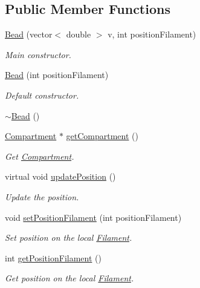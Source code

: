 \subsection*{Public Member Functions}
\begin{DoxyCompactItemize}
\item 
\hyperlink{classBead_aa91581c9111d101b95bec920798e22ac}{Bead} (vector$<$ double $>$ v, int position\+Filament)
\begin{DoxyCompactList}\small\item\em Main constructor. \end{DoxyCompactList}\item 
\hyperlink{classBead_a5bb15ab11fee13f78721759cadb5a5b4}{Bead} (int position\+Filament)
\begin{DoxyCompactList}\small\item\em Default constructor. \end{DoxyCompactList}\item 
\hyperlink{classBead_a21f0ccd7041f56c4038171d0da3a58ed}{$\sim$\+Bead} ()
\item 
\hyperlink{classCompartment}{Compartment} $\ast$ \hyperlink{classBead_ae6cfcc2936a2e12a3887c9fd824c6343}{get\+Compartment} ()
\begin{DoxyCompactList}\small\item\em Get \hyperlink{classCompartment}{Compartment}. \end{DoxyCompactList}\item 
virtual void \hyperlink{classBead_adfda91d08764f284b4a23c05da34c84c}{update\+Position} ()
\begin{DoxyCompactList}\small\item\em Update the position. \end{DoxyCompactList}\item 
void \hyperlink{classBead_a3178379864ec93ff5e9f8a2e7916c94a}{set\+Position\+Filament} (int position\+Filament)
\begin{DoxyCompactList}\small\item\em Set position on the local \hyperlink{classFilament}{Filament}. \end{DoxyCompactList}\item 
int \hyperlink{classBead_a3df2bf2b6063545ba9a68b890004057e}{get\+Position\+Filament} ()
\begin{DoxyCompactList}\small\item\em Get position on the local \hyperlink{classFilament}{Filament}. \end{DoxyCompactList}\item 

\end{DoxyCompactItemize}
